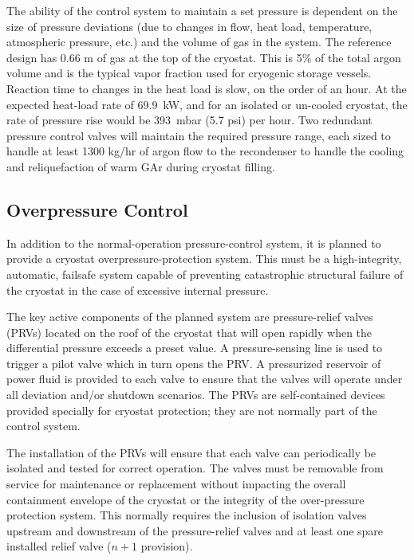 The ability of the control system to maintain a set pressure is 
dependent on the size of pressure deviations (due to changes in flow, 
heat load, temperature, atmospheric pressure, etc.) and the volume 
of gas in the system.  The reference design has 0.66 m 
of gas at the top of the cryostat.  This is 5\% of the total 
argon volume and is the typical vapor fraction used for cryogenic 
storage vessels. Reaction time to changes in the heat load is slow, 
on the order of an hour.  At the expected heat-load rate of 
69.9~kW, and for an isolated or un-cooled cryostat,
the rate of pressure rise would be 393~mbar (5.7 psi) per hour. 
Two redundant pressure control valves will
maintain the required pressure range, each sized to handle 
at least 1300 kg/hr of argon flow to the recondenser to handle 
the cooling and reliquefaction of warm GAr during cryostat filling.


\subsection{Overpressure Control}

In addition to the normal-operation pressure-control system, 
it is planned to provide a cryostat overpressure-protection 
system. This must be a high-integrity, automatic, failsafe
system capable of preventing catastrophic structural failure
of the cryostat in the case of excessive internal pressure.

The key active components of the planned system are pressure-relief 
valves (PRVs) located on the roof of the cryostat that will open rapidly when the differential pressure exceeds a 
preset value. A pressure-sensing line is used to trigger a pilot 
valve which in turn opens the PRV. A pressurized reservoir of 
power fluid is provided to each valve to ensure that the valves 
will operate under all deviation and/or shutdown scenarios. The PRVs 
are self-contained devices provided specially for cryostat protection; 
they are not normally part of the control system. 

The installation of the PRVs will ensure that each valve can 
periodically be isolated and tested for correct operation.  
The valves must be removable from service for maintenance 
or replacement without impacting the overall containment envelope 
of the cryostat or the integrity of the over-pressure protection 
system.  This normally requires the inclusion of isolation valves 
upstream and downstream of the pressure-relief valves and at least
one spare installed relief valve ($n+1$ provision).

